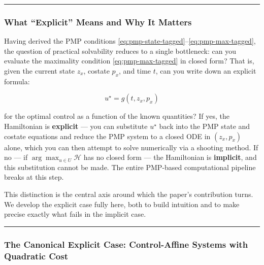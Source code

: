 \documentclass{article}
\begin{document}
\medskip\hrule\medskip

\subsubsection{What ``Explicit'' Means and Why It Matters}

\begin{tldrbox}
Having derived the PMP conditions \eqref{eq:pmp-state-tagged}--\eqref{eq:pmp-max-tagged}, the question of practical solvability reduces to a single bottleneck: can you evaluate the maximality condition \eqref{eq:pmp-max-tagged} in closed form? That is, given the current state $z_x$, costate $p_x$, and time $t$, can you write down an explicit formula:

$$u^\star = g(t, z_x, p_x)$$

for the optimal control as a function of the known quantities? If yes, the Hamiltonian is \textbf{explicit} — you can substitute $u^\star$ back into the PMP state and costate equations and reduce the PMP system to a closed ODE in $(z_x, p_x)$ alone, which you can then attempt to solve numerically via a shooting method. If no — if $\arg\max_{u \in U} \mathcal{H}$ has no closed form — the Hamiltonian is \textbf{implicit}, and this substitution cannot be made. The entire PMP-based computational pipeline breaks at this step.

This distinction is the central axis around which the paper's contribution turns. We develop the explicit case fully here, both to build intuition and to make precise exactly what fails in the implicit case.
\end{tldrbox}

\medskip\hrule\medskip

\subsubsection{The Canonical Explicit Case: Control-Affine Systems with Quadratic Cost}
\end{document}
